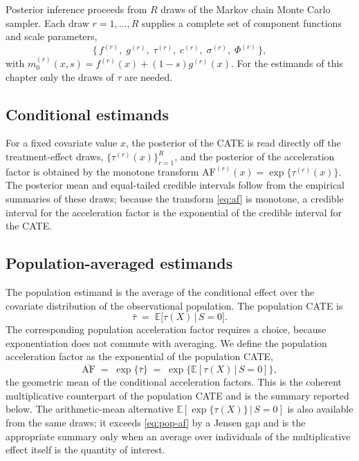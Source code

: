 \documentclass[11pt]{report}
\theoremstyle{plain}
\theoremstyle{definition}
\theoremstyle{remark}
\newcommand{\E}{\mathbb{E}}
\newcommand{\1}{\mathds{1}}
\theoremstyle{plain}
\theoremstyle{remark}
\newcommand{\given}{\,\vert\,}
\newcommand{\af}{\mathrm{AF}}
\begin{document}
Posterior inference proceeds from $R$ draws of the Markov chain Monte Carlo
sampler. Each draw $r = 1, \dots, R$ supplies a complete set of component
functions and scale parameters,
\[
\bigl\{\, f^{(r)},\; g^{(r)},\; \tau^{(r)},\; c^{(r)},\; \sigma^{(r)},\;
\Phi^{(r)} \,\bigr\},
\]
with $m_0^{(r)}(x, s) = f^{(r)}(x) + (1-s) g^{(r)}(x)$. For the estimands of this
chapter only the draws of $\tau$ are needed.

\subsection{Conditional estimands}

For a fixed covariate value $x$, the posterior of the CATE is read directly off
the treatment-effect draws, $\{\tau^{(r)}(x)\}_{r=1}^{R}$, and the posterior of
the acceleration factor is obtained by the monotone transform
$\af^{(r)}(x) = \exp\{\tau^{(r)}(x)\}$. The posterior mean and equal-tailed
credible intervals follow from the empirical summaries of these draws; because
the transform \eqref{eq:af} is monotone, a credible interval for the
acceleration factor is the exponential of the credible interval for the CATE.

\subsection{Population-averaged estimands}

The population estimand is the average of the conditional effect over the
covariate distribution of the observational population. The population CATE is
\begin{equation}
\label{eq:pop-cate}
\bar\tau \;=\; \E\bigl[\tau(X) \given S = 0\bigr].
\end{equation}
The corresponding population acceleration factor requires a choice, because
exponentiation does not commute with averaging. We define the population
acceleration factor as the exponential of the population CATE,
\begin{equation}
\label{eq:pop-af}
\overline{\af} \;=\; \exp\{\bar\tau\}
              \;=\; \exp\bigl\{\E[\tau(X)\given S=0]\bigr\},
\end{equation}
the geometric mean of the conditional acceleration factors. This is the coherent
multiplicative counterpart of the population CATE and is the summary reported
below. The arithmetic-mean alternative $\E[\exp\{\tau(X)\}\given S=0]$ is also
available from the same draws; it exceeds \eqref{eq:pop-af} by a Jensen gap and
is the appropriate summary only when an average over individuals of the
multiplicative effect itself is the quantity of interest.
\end{document}

